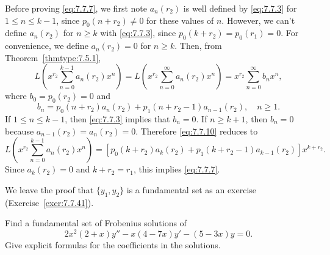 Before proving \eqref{eq:7.7.7}, we first note $a_{n}(r_{2})$ is well defined by \eqref{eq:7.7.3}
for $1\le n\le k-1$, since $p_{0}(n+r_{2})\ne0$ for these values of $n$. However, we can't define
$a_{n}(r_{2})$ for $n\ge k$ with \eqref{eq:7.7.3}, since $p_{0}(k+r_{2})=p_{0}(r_{1})=0$. For
convenience, we define $a_{n}(r_{2})=0$ for $n\ge k$. Then, from Theorem~\ref{thmtype:7.5.1},
\begin{equation}
  \label{eq:7.7.10}L\left(x^{r_{2}}\sum_{n=0}^{k-1}a_{n}(r_{2})x^{n}\right)= L\left(x^{r_{2}}\sum_{n=0}^{\infty}a_{n}(r_{2})x^{n}\right)= x^{r_{2}}\sum_{n=0}^{\infty}b_{n}x^{n},
\end{equation}
where $b_{0}=p_{0}(r_{2})=0$ and
\[
  b_{n}=p_{0}(n+r_{2})a_{n}(r_{2})+p_{1}(n+r_{2}-1)a_{n-1}(r_{2}),\quad n\ge1.
\]
If $1\le n\le k-1$, then \eqref{eq:7.7.3} implies that $b_{n}=0$. If $n\ge k+1$, then $b_{n}=0$
because $a_{n-1}(r_{2})=a_{n}(r_{2})=0$. Therefore \eqref{eq:7.7.10} reduces to
\[
  L\left(x^{r_{2}}\sum_{n=0}^{k-1}a_{n}(r_{2})x^{n}\right)= \left[p_{0}(k+r_{2})a_{k}(r_{2})+p_{1}(k+r_{2}-1)a_{k-1}(r_{2}) \right]x^{k+r_{2}}.
\]
Since $a_{k}(r_{2})=0$ and $k+r_{2}=r_{1}$, this implies \eqref{eq:7.7.7}.

We leave the proof that $\{y_{1},y_{2}\}$ is a fundamental set as an exercise
(Exercise~\ref{exer:7.7.41}).

\begin{example}
  \label{example:7.7.1} \rm Find a fundamental set of Frobenius solutions of
  \[
    2x^{2}(2+x)y''-x(4-7x)y'-(5-3x)y=0.
  \]
  Give explicit formulas for the coefficients in the solutions.
\end{example}

